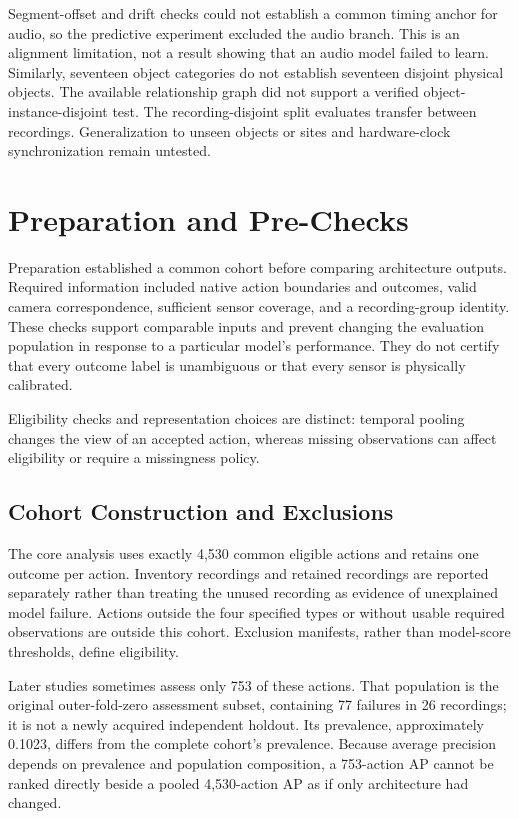 Segment-offset and drift checks could not establish a common timing anchor for audio, so
the predictive experiment excluded the audio branch. This is an alignment limitation,
not a result showing that an audio model failed to learn. Similarly, seventeen object
categories do not establish seventeen disjoint physical objects. The available
relationship graph did not support a verified object-instance-disjoint test. The
recording-disjoint split evaluates transfer between recordings. Generalization to unseen
objects or sites and hardware-clock synchronization remain untested.

\section{Preparation and Pre-Checks}
Preparation established a common cohort before comparing architecture outputs. Required
information included native action boundaries and outcomes, valid camera correspondence,
sufficient sensor coverage, and a recording-group identity. These checks support
comparable inputs and prevent changing the evaluation population in response to a
particular model's performance. They do not certify that every outcome label is
unambiguous or that every sensor is physically calibrated.

Eligibility checks and representation choices are distinct: temporal pooling changes the
view of an accepted action, whereas missing observations can affect eligibility or
require a missingness policy.

\subsection{Cohort Construction and Exclusions}
The core analysis uses exactly 4,530 common eligible actions and retains one outcome per
action. Inventory recordings and retained recordings are reported separately rather than
treating the unused recording as evidence of unexplained model failure. Actions outside
the four specified types or without usable required observations are outside this
cohort. Exclusion manifests, rather than model-score thresholds, define eligibility.

Later studies sometimes assess only 753 of these actions. That population is the
original outer-fold-zero assessment subset, containing 77 failures in 26 recordings; it
is not a newly acquired independent holdout. Its prevalence, approximately 0.1023,
differs from the complete cohort's prevalence. Because average precision depends on
prevalence and population composition, a 753-action AP cannot be ranked directly beside
a pooled 4,530-action AP as if only architecture had changed.

